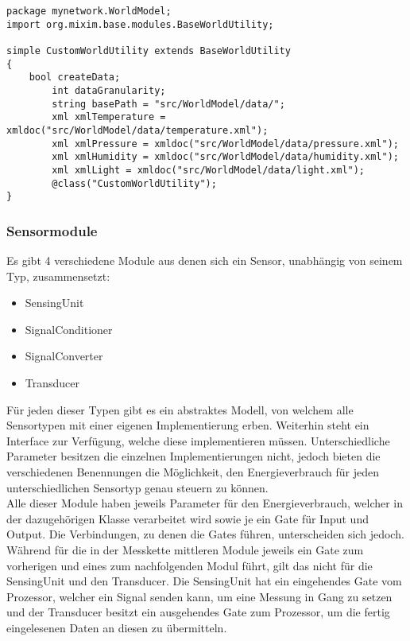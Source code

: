 \begin{minipage}{\textwidth}
\begin{lstlisting}[language=ned,caption={CustomWorldUtility},label=lst:CustomWorldUtility]
package mynetwork.WorldModel;
import org.mixim.base.modules.BaseWorldUtility;

simple CustomWorldUtility extends BaseWorldUtility
{
    bool createData;
        int dataGranularity;
        string basePath = "src/WorldModel/data/";
        xml xmlTemperature = xmldoc("src/WorldModel/data/temperature.xml");
        xml xmlPressure = xmldoc("src/WorldModel/data/pressure.xml");
        xml xmlHumidity = xmldoc("src/WorldModel/data/humidity.xml");
        xml xmlLight = xmldoc("src/WorldModel/data/light.xml");
        @class("CustomWorldUtility");
}
\end{lstlisting}
\end{minipage}

\subsubsection{Sensormodule}

Es gibt 4 verschiedene Module aus denen sich ein Sensor, unabhängig von seinem Typ, zusammensetzt:

\begin{minipage}{\textwidth}
\begin{itemize}
\item SensingUnit
\item SignalConditioner
\item SignalConverter
\item Transducer
\end{itemize}
\end{minipage}

Für jeden dieser Typen gibt es ein abstraktes Modell, von welchem alle Sensortypen mit einer eigenen Implementierung erben. Weiterhin steht ein Interface zur Verfügung, welche diese implementieren müssen. Unterschiedliche Parameter besitzen die einzelnen Implementierungen nicht, jedoch bieten die verschiedenen Benennungen die Möglichkeit, den Energieverbrauch für jeden unterschiedlichen Sensortyp genau steuern zu können.\\
Alle dieser Module haben jeweils Parameter für den Energieverbrauch, welcher in der dazugehörigen Klasse verarbeitet wird sowie je ein Gate für Input und Output. Die Verbindungen, zu denen die Gates führen, unterscheiden sich jedoch.\\
Während für die in der Messkette mittleren Module jeweils ein Gate zum vorherigen und eines zum nachfolgenden Modul führt, gilt das nicht für die SensingUnit und den Transducer. Die SensingUnit hat ein eingehendes Gate vom Prozessor, welcher ein Signal senden kann, um eine Messung in Gang zu setzen und der Transducer besitzt ein ausgehendes Gate zum Prozessor, um die fertig eingelesenen Daten an diesen zu übermitteln.

